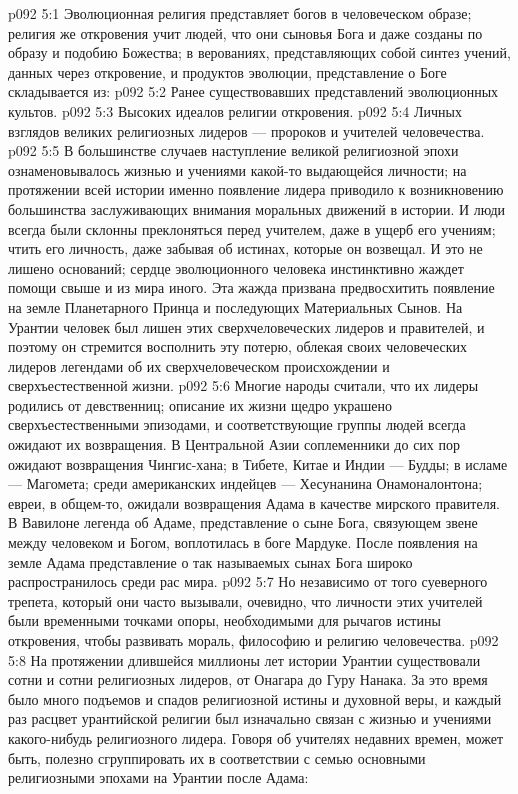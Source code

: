 \vs p092 5:1 Эволюционная религия представляет богов в человеческом образе; религия же откровения учит людей, что они сыновья Бога и даже созданы по образу и подобию Божества; в верованиях, представляющих собой синтез учений, данных через откровение, и продуктов эволюции, представление о Боге складывается из:
\vs p092 5:2 \bibnobreakspace Ранее существовавших представлений эволюционных культов.
\vs p092 5:3 \bibnobreakspace Высоких идеалов религии откровения.
\vs p092 5:4 \bibnobreakspace Личных взглядов великих религиозных лидеров --- пророков и учителей человечества.
\vs p092 5:5 \pc В большинстве случаев наступление великой религиозной эпохи ознаменовывалось жизнью и учениями какой\hyp{}то выдающейся личности; на протяжении всей истории именно появление лидера приводило к возникновению большинства заслуживающих внимания моральных движений в истории. И люди всегда были склонны преклоняться перед учителем, даже в ущерб его учениям; чтить его личность, даже забывая об истинах, которые он возвещал. И это не лишено оснований; сердце эволюционного человека инстинктивно жаждет помощи свыше и из мира иного. Эта жажда призвана предвосхитить появление на земле Планетарного Принца и последующих Материальных Сынов. На Урантии человек был лишен этих сверхчеловеческих лидеров и правителей, и поэтому он стремится восполнить эту потерю, облекая своих человеческих лидеров легендами об их сверхчеловеческом происхождении и сверхъестественной жизни.
\vs p092 5:6 Многие народы считали, что их лидеры родились от девственниц; описание их жизни щедро украшено сверхъестественными эпизодами, и соответствующие группы людей всегда ожидают их возвращения. В Центральной Азии соплеменники до сих пор ожидают возвращения Чингис\hyp{}хана; в Тибете, Китае и Индии --- Будды; в исламе --- Магомета; среди американских индейцев --- Хесунанина Онамоналонтона; евреи, в общем\hyp{}то, ожидали возвращения Адама в качестве мирского правителя. В Вавилоне легенда об Адаме, представление о сыне Бога, связующем звене между человеком и Богом, воплотилась в боге Мардуке. После появления на земле Адама представление о так называемых сынах Бога широко распространилось среди рас мира.
\vs p092 5:7 Но независимо от того суеверного трепета, который они часто вызывали, очевидно, что личности этих учителей были временными точками опоры, необходимыми для рычагов истины откровения, чтобы развивать мораль, философию и религию человечества.
\vs p092 5:8 На протяжении длившейся миллионы лет истории Урантии существовали сотни и сотни религиозных лидеров, от Онагара до Гуру Нанака. За это время было много подъемов и спадов религиозной истины и духовной веры, и каждый раз расцвет урантийской религии был изначально связан с жизнью и учениями какого\hyp{}нибудь религиозного лидера. Говоря об учителях недавних времен, может быть, полезно сгруппировать их в соответствии с семью основными религиозными эпохами на Урантии после Адама:

